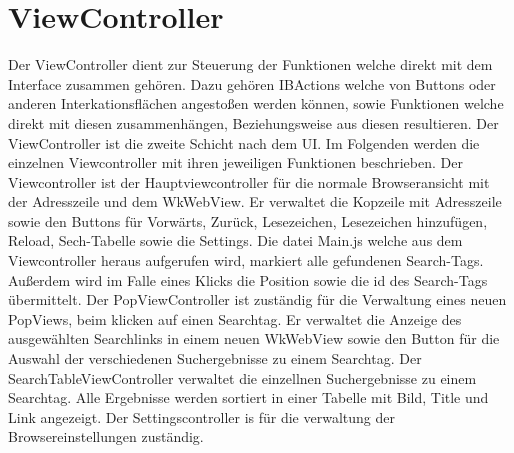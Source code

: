 
\section{ViewController}
Der ViewController dient zur Steuerung der Funktionen welche direkt mit dem Interface zusammen gehören. Dazu gehören
IBActions welche von Buttons oder anderen Interkationsflächen angestoßen werden können, sowie Funktionen welche direkt mit diesen zusammenhängen, Beziehungsweise aus diesen resultieren. Der ViewController ist die zweite Schicht nach dem UI. Im
Folgenden werden die einzelnen Viewcontroller mit ihren jeweiligen Funktionen beschrieben.
Der Viewcontroller ist der Hauptviewcontroller für die normale Browseransicht mit der Adresszeile und dem WkWebView. Er verwaltet die Kopzeile mit Adresszeile sowie den Buttons für Vorwärts, Zurück, Lesezeichen, Lesezeichen hinzufügen, Reload, Sech-Tabelle sowie die Settings. Die datei Main.js welche aus dem Viewcontroller heraus aufgerufen wird, markiert alle gefundenen Search-Tags. Außerdem wird im Falle eines Klicks die Position sowie die id des Search-Tags übermittelt.
Der PopViewController ist zuständig für die Verwaltung eines neuen PopViews, beim klicken auf einen Searchtag. Er verwaltet die Anzeige des ausgewählten Searchlinks in einem neuen WkWebView sowie den Button für die Auswahl der verschiedenen Suchergebnisse zu einem Searchtag.
Der SearchTableViewController verwaltet die einzellnen Suchergebnisse zu einem Searchtag. Alle Ergebnisse werden sortiert in einer Tabelle mit Bild, Title und Link angezeigt.
Der Settingscontroller is für die verwaltung der Browsereinstellungen zuständig.


